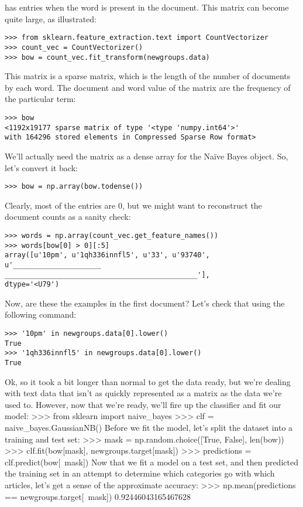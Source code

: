 has entries when the word is present in the document. This matrix can become quite large,
as illustrated:
\begin{framed}
\begin{verbatim}
>>> from sklearn.feature_extraction.text import CountVectorizer
>>> count_vec = CountVectorizer()
>>> bow = count_vec.fit_transform(newgroups.data)
\end{verbatim}
\end{framed}
This matrix is a sparse matrix, which is the length of the number of documents by each word.
The document and word value of the matrix are the frequency of the particular term:
\begin{framed}
\begin{verbatim}
>>> bow
<1192x19177 sparse matrix of type '<type 'numpy.int64'>'
with 164296 stored elements in Compressed Sparse Row format>
\end{verbatim}
\end{framed}
We'll actually need the matrix as a dense array for the Naïve Bayes object. So, let's convert
it back:
\begin{framed}
	\begin{verbatim}
>>> bow = np.array(bow.todense())
\end{verbatim}
\end{framed}
Clearly, most of the entries are 0, but we might want to reconstruct the document counts as
a sanity check:
\begin{framed}
	\begin{verbatim}
>>> words = np.array(count_vec.get_feature_names())
>>> words[bow[0] > 0][:5]
array([u'10pm', u'1qh336innfl5', u'33', u'93740', u'_____________________
______________________________________________'],
dtype='<U79')
\end{verbatim}
\end{framed}
Now, are these the examples in the first document? Let's check that using the
following command:
\begin{framed}
	\begin{verbatim}
>>> '10pm' in newgroups.data[0].lower()
True
>>> '1qh336innfl5' in newgroups.data[0].lower()
True
\end{verbatim}
\end{framed}
Ok, so it took a bit longer than normal to get the data ready, but we're dealing with text data
that isn't as quickly represented as a matrix as the data we're used to.
However, now that we're ready, we'll fire up the classifier and fit our model:
>>> from sklearn import naive_bayes
>>> clf = naive_bayes.GaussianNB()
Before we fit the model, let's split the dataset into a training and test set:
>>> mask = np.random.choice([True, False], len(bow))
>>> clf.fit(bow[mask], newgroups.target[mask])
>>> predictions = clf.predict(bow[~mask])
Now that we fit a model on a test set, and then predicted the training set in an attempt to
determine which categories go with which articles, let's get a sense of the approximate
accuracy:
>>> np.mean(predictions == newgroups.target[~mask])
0.92446043165467628
